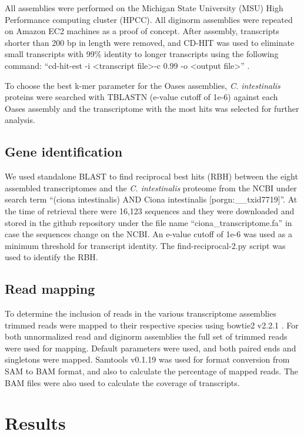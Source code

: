 \documentclass[fleqn,10pt]{wlpeerj}
\begin{document}
All assemblies were performed on the Michigan State University (MSU) High Performance computing cluster (HPCC).  All diginorm assemblies were repeated on Amazon EC2 machines as a proof of concept.
After assembly, transcripts shorter than 200 bp in length were removed, and CD-HIT was used to eliminate small transcripts with 99\% identity to longer transcripts using the following command: ``cd-hit-est -i \textless transcript file\textgreater -c 0.99 -o \textless output file\textgreater'' \citep{li_cd-hit:_2006}.

To choose the best k-mer parameter for the Oases assemblies, \textit{C. intestinalis} proteins were searched with TBLASTN (e-value cutoff of 1e-6) against each Oases assembly and the transcriptome with the most hits was selected for further analysis.
\subsection{Gene identification}
We used standalone BLAST to find reciprocal best hits (RBH) between the eight assembled transcriptomes and the \textit{C. intestinalis} proteome from the NCBI under search term ``(ciona intestinalis) AND Ciona intestinalis [porgn:\_\_txid7719]''. At the time of retrieval there were 16,123 sequences and they were downloaded and stored in the github repository under the file name ``ciona\_transcriptome.fa'' in case the sequences change on the NCBI. An e-value cutoff of 1e-6 was used as a minimum threshold for transcript identity.  The find-reciprocal-2.py script was used to identify the RBH.
\subsection{Read mapping}
	To determine the inclusion of reads in the various transcriptome assemblies trimmed reads were mapped to their respective species using bowtie2 v2.2.1 \citep{langmead_fast_2012}. For both unnormalized read and diginorm assemblies the full set of trimmed reads were used for mapping. Default parameters were used, and both paired ends and singletons were mapped. Samtools v0.1.19 \citep{li_sequence_2009} was used for format conversion from SAM to BAM format, and also to calculate the percentage of mapped reads. The BAM files were also used to calculate the coverage of transcripts.

\section{Results}
\end{document}
